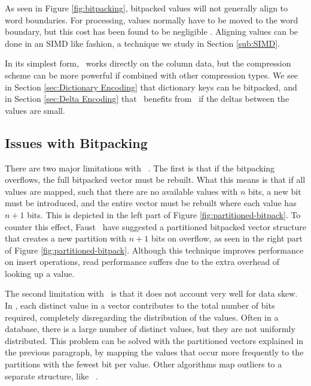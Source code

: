 As seen in Figure \ref{fig:bitpacking}, bitpacked values will not generally align to word boundaries. For processing, values normally have to be moved to the word boundary, but this cost has been found to be negligible \cite{Holloway2008-rr}. Aligning values can be done in an SIMD like fashion, a technique we study in Section \ref{sub:SIMD}.

In its simplest form, \bp~works directly on the column data, but the compression scheme can be more powerful if combined with other compression types. We see in Section \ref{sec:Dictionary Encoding} that dictionary keys can be bitpacked, and in Section \ref{sec:Delta Encoding} that \dele~benefits from \bp~if the deltas between the values are small. 

\subsection{Issues with Bitpacking}
\label{sub:Issues with Bitpacking}
There are two major limitations with \bp~\cite{Faust2015-ke}. The first is that if the bitpacking overflows, the full bitpacked vector must be rebuilt. What this means is that if all values are mapped, such that there are no available values with $n$ bits, a new bit must be introduced, and the entire vector must be rebuilt where each value has $n + 1$ bits. This is depicted in the left part of Figure \ref{fig:partitioned-bitpack}. To counter this effect, Faust \ea~have suggested a partitioned bitpacked vector structure that creates a new partition with $n + 1$ bits on overflow, as seen in the right part of Figure \ref{fig:partitioned-bitpack}. Although this technique improves performance on insert operations, read performance suffers due to the extra overhead of looking up a value.

The second limitation with \bp~is that it does not account very well for data skew. In \bp, each distinct value in a vector contributes to the total number of bits required, completely disregarding the distribution of the values. Often in a database, there is a large number of distinct values, but they are not uniformly distributed. This problem can be solved with the partitioned vectors explained in the previous paragraph, by mapping the values that occur more frequently to the partitions with the fewest bit per value. Other algorithms map outliers to a separate structure, like \pfdelta~\cite{Bjorklund2011-wh}.



